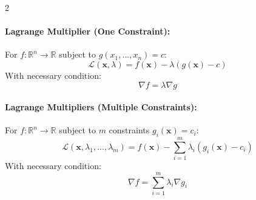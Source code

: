 \begin{multicols}{2}
\paragraph{Lagrange Multiplier (One Constraint):}
For \(f: \mathbb{R}^n \to \mathbb{R}\) subject to \(g(x_1,...,x_n) = c\):
\[
\mathcal{L}(\mathbf{x},\lambda) = f(\mathbf{x}) - \lambda(g(\mathbf{x}) - c)
\]
With necessary condition:
\[
\nabla f = \lambda \nabla g
\]

\paragraph{Lagrange Multipliers (Multiple Constraints):}
For \(f: \mathbb{R}^n \to \mathbb{R}\) subject to \(m\) constraints \(g_i(\mathbf{x}) = c_i\):
\[
\mathcal{L}(\mathbf{x},\lambda_1,...,\lambda_m) = f(\mathbf{x}) - \sum_{i=1}^m \lambda_i(g_i(\mathbf{x}) - c_i)
\]
With necessary condition:
\[
\nabla f = \sum_{i=1}^m \lambda_i \nabla g_i
\]

\end{multicols}




\newpage


\practice{}

